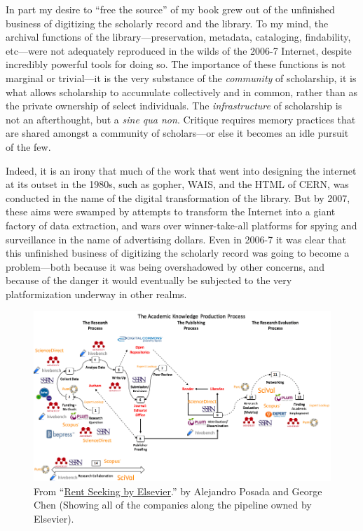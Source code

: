 \documentclass[11pt]{article}
\begin{document}
In part my desire to ``free the source'' of my book grew out of the unfinished business of digitizing the scholarly record and the library.  To my mind, the archival functions of the library---preservation, metadata, cataloging, findability, etc---were not adequately reproduced in the wilds of the 2006-7 Internet, despite incredibly powerful tools for doing so. The importance of these functions is not marginal or trivial---it is the very substance of the \emph{community} of scholarship, it is what allows scholarship to accumulate collectively and in common, rather than as the private ownership of select individuals. The \emph{infrastructure} of scholarship is not an afterthought, but a \emph{sine qua non}.  Critique requires memory practices that are shared amongst a community of scholars---or else it becomes an idle pursuit of the few. 

Indeed, it is an irony that much of the work that went into designing the internet at its outset in the 1980s, such as gopher, WAIS, and the HTML of CERN, was conducted in the name of the digital transformation of the library.  But by 2007, these aims were swamped by attempts to transform the Internet into a giant factory of data extraction, and wars over winner-take-all platforms for spying and surveillance in the name of advertising dollars.  Even in 2006-7 it was clear that this unfinished business of digitizing the scholarly record was going to become a problem---both because it was being overshadowed by other concerns, and because of the danger it would eventually be subjected to the very platformization underway in other realms. 

\begin{figure}[htbp]
\centering
\includegraphics[width=.9\linewidth]{./with-companies.png}
\caption{\label{fig:orgea685dc}
From ``\href{http://knowledgegap.org/index.php/sub-projects/rent-seeking-and-financialization-of-the-academic-publishing-industry/preliminary-findings/}{Rent Seeking by Elsevier}.'' by Alejandro Posada and George Chen (Showing all of the companies along the pipeline owned by Elsevier).}
\end{figure}
\end{document}
